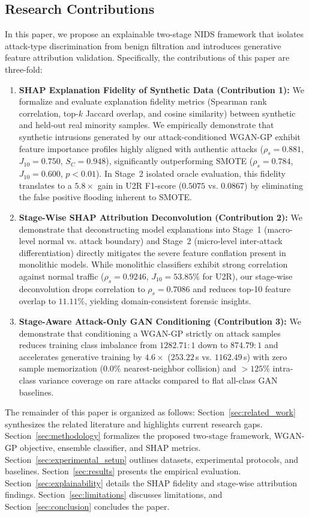\documentclass[journal]{IEEEtran}
\begin{document}
\subsection{Research Contributions}
In this paper, we propose an explainable two-stage NIDS framework that isolates attack-type discrimination from benign filtration and introduces generative feature attribution validation. Specifically, the contributions of this paper are three-fold:
\begin{enumerate}
    \item \textbf{SHAP Explanation Fidelity of Synthetic Data (Contribution 1):} We formalize and evaluate explanation fidelity metrics (Spearman rank correlation, top-$k$ Jaccard overlap, and cosine similarity) between synthetic and held-out real minority samples. We empirically demonstrate that synthetic intrusions generated by our attack-conditioned WGAN-GP exhibit feature importance profiles highly aligned with authentic attacks ($\rho_s = 0.881$, $J_{10} = 0.750$, $S_C = 0.948$), significantly outperforming SMOTE ($\rho_s = 0.784$, $J_{10} = 0.600$, $p < 0.01$). In Stage~2 isolated oracle evaluation, this fidelity translates to a $5.8\times$ gain in U2R F1-score ($0.5075$ vs. $0.0867$) by eliminating the false positive flooding inherent to SMOTE.
    \item \textbf{Stage-Wise SHAP Attribution Deconvolution (Contribution 2):} We demonstrate that deconstructing model explanations into Stage~1 (macro-level normal vs. attack boundary) and Stage~2 (micro-level inter-attack differentiation) directly mitigates the severe feature conflation present in monolithic models. While monolithic classifiers exhibit strong correlation against normal traffic ($\rho_s = 0.9246$, $J_{10} = 53.85\%$ for U2R), our stage-wise deconvolution drops correlation to $\rho_s = 0.7086$ and reduces top-10 feature overlap to $11.11\%$, yielding domain-consistent forensic insights.
    \item \textbf{Stage-Aware Attack-Only GAN Conditioning (Contribution 3):} We demonstrate that conditioning a WGAN-GP strictly on attack samples reduces training class imbalance from $1282.71:1$ down to $874.79:1$ and accelerates generative training by $4.6\times$ ($253.22$\,s vs. $1162.49$\,s) with zero sample memorization ($0.0\%$ nearest-neighbor collision) and $>125\%$ intra-class variance coverage on rare attacks compared to flat all-class GAN baselines.
\end{enumerate}

The remainder of this paper is organized as follows: Section~\ref{sec:related_work} synthesizes the related literature and highlights current research gaps. Section~\ref{sec:methodology} formalizes the proposed two-stage framework, WGAN-GP objective, ensemble classifier, and SHAP metrics. Section~\ref{sec:experimental_setup} outlines datasets, experimental protocols, and baselines. Section~\ref{sec:results} presents the empirical evaluation. Section~\ref{sec:explainability} details the SHAP fidelity and stage-wise attribution findings. Section~\ref{sec:limitations} discusses limitations, and Section~\ref{sec:conclusion} concludes the paper.
\end{document}
